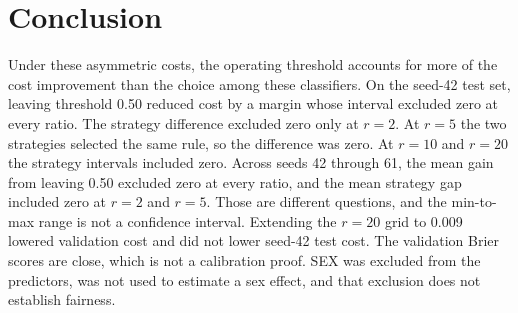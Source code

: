 \documentclass[12pt]{article}
\begin{document}
\section{Conclusion}
Under these asymmetric costs, the operating threshold accounts for more of the cost improvement than the choice among these classifiers. On the seed-42 test set, leaving threshold 0.50 reduced cost by a margin whose interval excluded zero at every ratio. The strategy difference excluded zero only at \(r=2\). At \(r=5\) the two strategies selected the same rule, so the difference was zero. At \(r=10\) and \(r=20\) the strategy intervals included zero. Across seeds 42 through 61, the mean gain from leaving 0.50 excluded zero at every ratio, and the mean strategy gap included zero at \(r=2\) and \(r=5\). Those are different questions, and the min-to-max range is not a confidence interval. Extending the \(r=20\) grid to 0.009 lowered validation cost and did not lower seed-42 test cost. The validation Brier scores are close, which is not a calibration proof. SEX was excluded from the predictors, was not used to estimate a sex effect, and that exclusion does not establish fairness.
\end{document}
